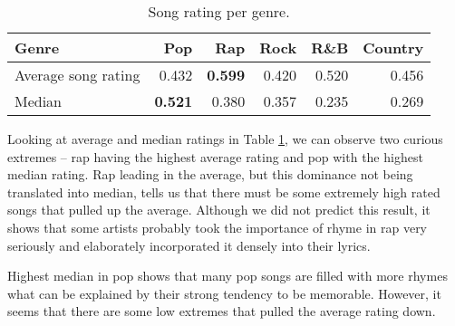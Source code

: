 \begin{table}[h!]
	\centering
	\begin{tabular}{l | r r r r r} 	
		Genre & 			Pop & 		Rap & 		Rock & 		R\&B & 		Country\\ 
		\midrule
		Average song rating& 0.432 & \textbf{0.599} &0.420 &0.520 &0.456  \\
		Median & \textbf{0.521} & 0.380 &0.357 &0.235 & 0.269\\
	\end{tabular}
	\caption{Song rating per genre.} 
	\label{song_rating_stats}
\end{table}

Looking at average and median ratings in Table \ref{song_rating_stats}, we can observe two curious extremes -- rap having the highest average rating and pop with the highest median rating. Rap leading in the average, but this dominance not being translated into median, tells us that there must be some extremely high rated songs that pulled up the average. Although we did not predict this result, it shows that some artists probably took the importance of rhyme in rap very seriously and elaborately incorporated it densely into their lyrics.

Highest median in pop shows that many pop songs are filled with more rhymes what can be explained by their strong tendency to be memorable. However, it seems that there are some low extremes that pulled the average rating down.